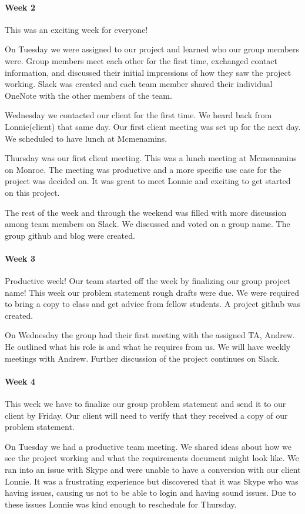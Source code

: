 \documentclass[draftclsnofoot, onecolumn, compsoc, 10pt]{IEEEtran}
\begin{document}
\paragraph{Week 2}
This was an exciting week for everyone! 

On Tuesday we were assigned to our project and learned who our group members were. Group members meet each other for the first time, exchanged contact information, and discussed their initial impressions of how they saw the project working. Slack was created and each team member shared their individual OneNote with the other members of the team. 

Wednesday we contacted our client for the first time. We heard back from Lonnie(client) that same day. Our first client meeting was set up for the next day. We scheduled to have lunch at Mcmenamins. 

Thursday was our first client meeting. This was a lunch meeting at Mcmenamins on Monroe. The meeting was productive and a more specific use case for the project was decided on. It was great to meet Lonnie and exciting to get started on this project. 

The rest of the week and through the weekend was filled with more discussion among team members on Slack. We discussed and voted on a group name. The group github and blog were created. 
\paragraph{Week 3}
Productive week! Our team started off the week by finalizing our group project name!  This week our problem statement rough drafts were due. We were required to bring a copy to class and get advice from fellow students. A project github was created. 

On Wednesday the group had their first meeting with the assigned TA, Andrew. He outlined what his role is and what he requires from us. We will have weekly meetings with Andrew. Further discussion of the project continues on Slack.  
\paragraph{Week 4}
This week we have to finalize our group problem statement and send it to our client by Friday. Our client will need to verify that they received a copy of our problem statement. 

On Tuesday we had a productive team meeting. We shared ideas about how we see the project working and what the requirements document might look like. We ran into an issue with Skype and were unable to have a conversion with our client Lonnie. It was a frustrating experience but discovered that it was Skype who was having issues, causing us not to be able to login and having sound issues. Due to these issues Lonnie was kind enough to reschedule for Thursday. 
\end{document}
